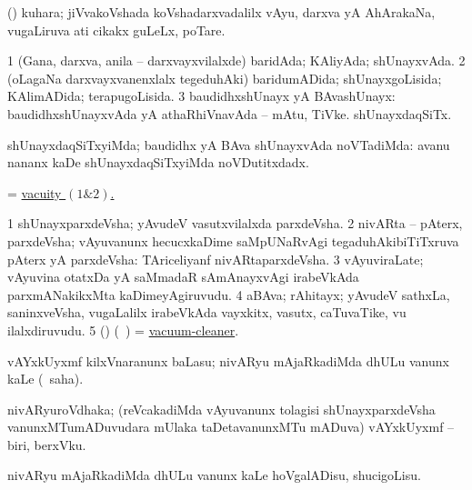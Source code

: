 \bentry
{} 
\gl{\nA}
\expl{}
\bmng
 (\jiVvi) kuhara; jiVvakoVshada koVshadarxvadalilx vAyu, darxva yA AhArakaNa, \mo vugaLiruva ati cikakx guLeLx, poTare. 
\emng
\eentry

\bentry
{} 
\gl{\gu}
\expl{}
\bmng
\bnum
\num{1} (Gana, darxva, anila -- darxvayxvilalxde) baridAda; KAliyAda; shUnayxvAda. 
\num{2} (oLagaNa darxvayxvanenxlalx tegeduhAki) baridumADida; shUnayxgoLisida; KAlimADida; terapugoLisida. 
\num{3} baudidhxshUnayx yA BAvashUnayx:  baudidhxshUnayxvAda yA athaRhiVnavAda -- mAtu, TiVke.  shUnayxdaqSiTx. 
\enum
\emng
\eentry

\bentry
{} 
\gl{\kirxvi}
\expl{}
\bmng
 shUnayxdaqSiTxyiMda; baudidhx yA BAva shUnayxvAda noVTadiMda:  avanu nananx kaDe shUnayxdaqSiTxyiMda noVDutitxdadx. 
\emng
\eentry

\bentry
{} 
\gl{\nA}
\expl{}
\bmng
 = \hyperlink{vacuity}{vacuity \((1 \& 2)\).} 
\emng
\eentry

\bentry
{} 
\gl{\nA}
\bmng
\bnum
\num{1} shUnayxparxdeVsha; yAvudeV vasutxvilalxda parxdeVsha. 
\num{2} nivARta -- pAterx, parxdeVsha; vAyuvanunx hecucxkaDime saMpUNaRvAgi tegaduhAkibiTiTxruva pAterx yA parxdeVsha:  TAriceliyanf nivARtaparxdeVsha. 
\num{3} vAyuviraLate; vAyuvina otatxDa yA saMmadaR sAmAnayxvAgi irabeVkAda parxmANakikxMta kaDimeyAgiruvudu. 
\num{4} aBAva; rAhitayx; yAvudeV sathxLa, saninxveVsha, \mo vugaLalilx irabeVkAda vayxkitx, vasutx, caTuvaTike, \mo vu ilalxdiruvudu. 
\num{5} (\AmA) (\bava\ ) = \hyperlink{vacuum-cleaner}{vacuum-cleaner}. 
\enum
\emng
\eentry

\bentry
{} 
\gl{\sakirx}
\expl{}
\bmng
 vAYxkUyxmf kilxVnaranunx baLasu; nivARyu mAjaRkadiMda dhULu \mo vanunx kaLe (\akirx\ saha). 
\emng
\eentry

\bentry
{}
\gl{\nA}
\expl{}
\bmng
 nivARyuroVdhaka; (reVcakadiMda vAyuvanunx tolagisi shUnayxparxdeVsha vanunxMTumADuvudara mUlaka taDetavanunxMTu mADuva) vAYxkUyxmf -- biri, berxVku. 
\emng
\eentry

\bentry
{} 
\gl{\sakirx}
\expl{}
\bmng
 nivARyu mAjaRkadiMda dhULu \mo vanunx kaLe hoVgalADisu, shucigoLisu. 
\emng
\eentry

